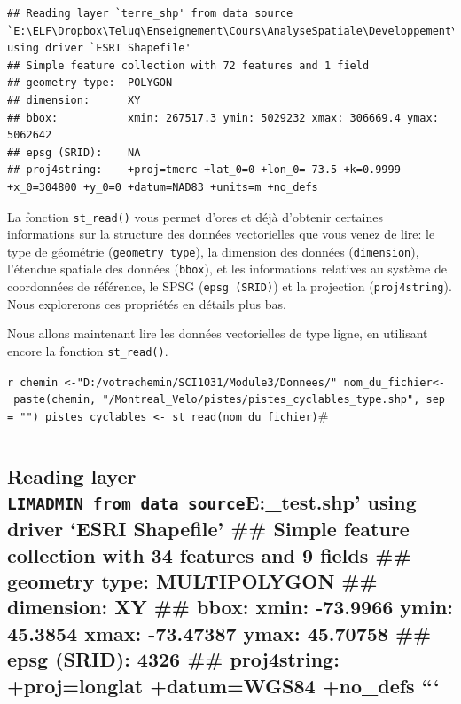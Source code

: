 \documentclass[]{article}
\begin{document}
\begin{verbatim}
## Reading layer `terre_shp' from data source `E:\ELF\Dropbox\Teluq\Enseignement\Cours\AnalyseSpatiale\Developpement\Structure_test\sci1031\Module3\data\Montreal_Velo\terre\terre_shp.shp' using driver `ESRI Shapefile'
## Simple feature collection with 72 features and 1 field
## geometry type:  POLYGON
## dimension:      XY
## bbox:           xmin: 267517.3 ymin: 5029232 xmax: 306669.4 ymax: 5062642
## epsg (SRID):    NA
## proj4string:    +proj=tmerc +lat_0=0 +lon_0=-73.5 +k=0.9999 +x_0=304800 +y_0=0 +datum=NAD83 +units=m +no_defs
\end{verbatim}

La fonction \texttt{st\_read()} vous permet d'ores et déjà d'obtenir
certaines informations sur la structure des données vectorielles que
vous venez de lire: le type de géométrie (\texttt{geometry\ type}), la
dimension des données (\texttt{dimension}), l'étendue spatiale des
données (\texttt{bbox}), et les informations relatives au système de
coordonnées de référence, le SPSG (\texttt{epsg\ (SRID)}) et la
projection (\texttt{proj4string}). Nous explorerons ces propriétés en
détails plus bas.

Nous allons maintenant lire les données vectorielles de type ligne, en
utilisant encore la fonction \texttt{st\_read()}.

\texttt{r\ chemin\ \textless{}-"D:/votrechemin/SCI1031/Module3/Donnees/"\ nom\_du\_fichier\textless{}-\ paste(chemin,\ "/Montreal\_Velo/pistes/pistes\_cyclables\_type.shp",\ sep\ =\ "")\ pistes\_cyclables\ \textless{}-\ st\_read(nom\_du\_fichier)}\#

\begin{verbatim}
\end{verbatim}

\subsection{\texorpdfstring{Reading layer
\texttt{LIMADMIN\textquotesingle{}\ from\ data\ source}E:\ELF\Dropbox\Teluq\Enseignement\Cours\AnalyseSpatiale\Developpement\Structure\_test\data\LIMADMIN.shp'
using driver `ESRI Shapefile' \#\# Simple feature collection with 34
features and 9 fields \#\# geometry type: MULTIPOLYGON \#\# dimension:
XY \#\# bbox: xmin: -73.9966 ymin: 45.3854 xmax: -73.47387 ymax:
45.70758 \#\# epsg (SRID): 4326 \#\# proj4string: +proj=longlat
+datum=WGS84 +no\_defs
```}{Reading layer LIMADMIN' from data sourceE:\_test10313.shp' using driver `ESRI Shapefile' \#\# Simple feature collection with 34 features and 9 fields \#\# geometry type: MULTIPOLYGON \#\# dimension: XY \#\# bbox: xmin: -73.9966 ymin: 45.3854 xmax: -73.47387 ymax: 45.70758 \#\# epsg (SRID): 4326 \#\# proj4string: +proj=longlat +datum=WGS84 +no\_defs ```}}\label{reading-layer-limadmin-from-data-sourcee_test10313.shp-using-driver-esri-shapefile-simple-feature-collection-with-34-features-and-9-fields-geometry-type-multipolygon-dimension-xy-bbox-xmin--73.9966-ymin-45.3854-xmax--73.47387-ymax-45.70758-epsg-srid-4326-proj4string-projlonglat-datumwgs84-no_defs}
\end{document}
